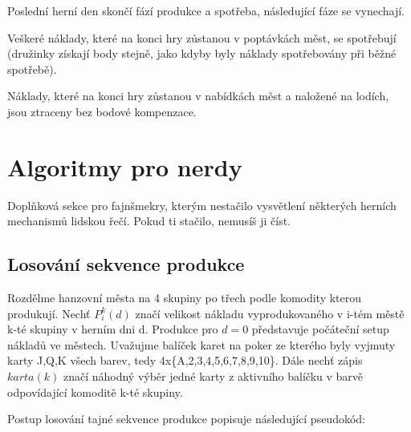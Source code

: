 \documentclass[a4paper, 12pt, twoside]{article}
\begin{document}
Poslední herní den skončí fází produkce a spotřeba, následující fáze se vynechají.

Veškeré náklady, které na konci hry zůstanou v poptávkách měst, se spotřebují (družinky získají body stejně, jako kdyby byly náklady spotřebovány při 
běžné spotřebě).

Náklady, které na konci hry zůstanou v nabídkách měst a naložené na lodích, jsou ztraceny bez bodové kompenzace.
\newpage{}
\section{Algoritmy pro nerdy}

\label{nerd}

Doplňková sekce pro fajnšmekry, kterým nestačilo vysvětlení některých herních mechanismů lidskou řečí.  Pokud ti stačilo, nemusíš ji číst.

\subsection{Losování sekvence produkce}

Rozdělme hanzovní města na 4 skupiny po třech podle komodity kterou produkují.  Nechť $P^{k}_{i}(d)$ značí velikost nákladu vyprodukovaného v i-tém městě k-té
skupiny v herním dni d.  Produkce pro $d=0$ představuje počáteční setup nákladů ve městech.  Uvažujme balíček karet na poker ze kterého byly vyjmuty karty J,Q,K všech barev, tedy 4x\{A,2,3,4,5,6,7,8,9,10\}.  Dále nechť zápis
$karta(k)$ značí náhodný výběr jedné karty z aktivního balíčku v barvě odpovídající komoditě k-té skupiny.

Postup losování tajné sekvence produkce popisuje následující pseudokód: \\
\null \\
\noindent{}
\end{document}
